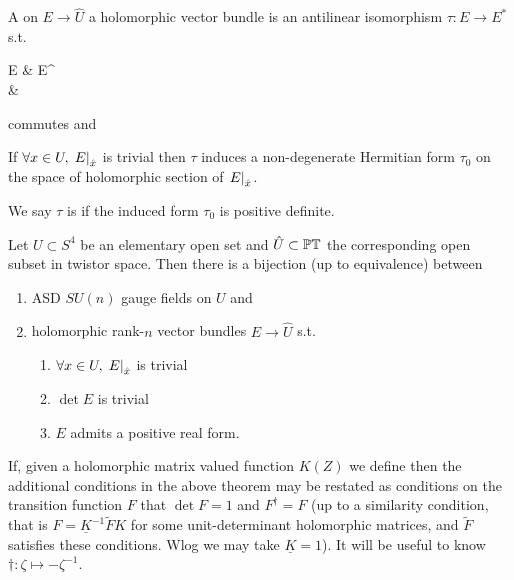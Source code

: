 \documentclass{article}
\begin{document}
\begin{definition}
	A  on $E \to \hat{U}$ a holomorphic vector bundle is an antilinear isomorphism $\tau:E \to E^\ast$ s.t. 
	\begin{tkz}
		E \arrow[r,"\tau"] \arrow[d] & E^\ast \arrow[d] \\  \arrow[r,"\sigma"] & 
	\end{tkz}
commutes and 
\end{definition}
\begin{lemma}
	If $\forall x \in U, \, \left. E \right\rvert_{\hat{x}}$ is trivial then $\tau$ induces a non-degenerate Hermitian form $\tau_0$ on the space of holomorphic section of $\left. E \right\rvert_{\hat{x}}$. 
\end{lemma}
\begin{definition}
	We say $\tau$ is  if the induced form $\tau_0$ is positive definite. 
\end{definition}
	
\begin{theorem}
	Let $U \subset S^4$ be an elementary open set and $\hat{U}\subset \mathbb{PT}$ the corresponding open subset in twistor space. Then there is a bijection (up to equivalence) between 
	\begin{enumerate}
		\item ASD $SU(n)$ gauge fields on $U$ and 
		\item holomorphic rank-$n$ vector bundles $E \to \hat{U}$ s.t. 
		\begin{enumerate}
			\item $\forall x \in U, \, \left. E \right\rvert_{\hat{x}}$ is trivial
			\item $\det E$ is trivial
			\item $E$ admits a positive real form. 
		\end{enumerate}
	\end{enumerate}
\end{theorem}

\begin{remark}
	If, given a holomorphic matrix valued function $K(Z)$ we define 
then the additional conditions in the above theorem may be restated as conditions on the transition function $F$ that $\det F =1$ and $F^\dagger=F$ (up to a similarity condition, that is $F = \underline{K}^{-1} \tilde{F} K$ for some unit-determinant holomorphic matrices, and $\tilde{F}$ satisfies these conditions. Wlog we may take $\underline{K}=1$). It will be useful to know $\dagger:\zeta \mapsto -\zeta^{-1}$. 
\end{remark}
\end{document}
